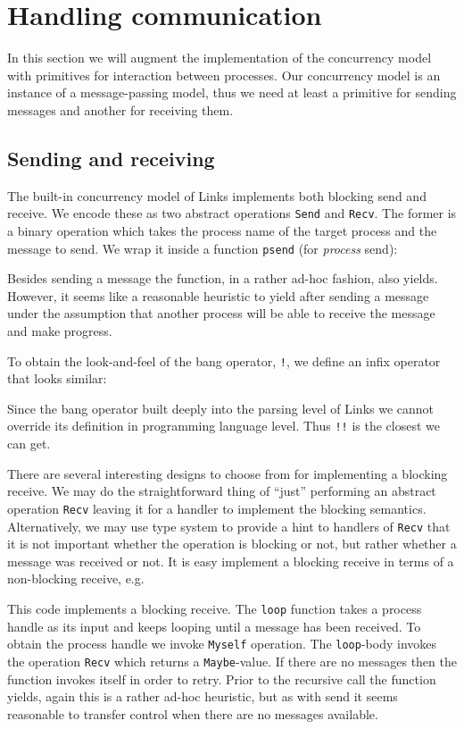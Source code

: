 \documentclass[12pt,mscres,cdtppar,twoside,openright,logo,rightchapter,normalheadings]{infthesis}
\newcommand{\snippet}[1]{}
\theoremstyle{definition}
\begin{document}
\section{Handling communication}
\label{sec:links-model-handlers-communication}

In this section we will augment the implementation of the concurrency
model with primitives for interaction between processes. Our
concurrency model is an instance of a message-passing model, thus we
need at least a primitive for sending messages and another for
receiving them.

\subsection{Sending and receiving}

The built-in concurrency model of Links implements both blocking send
and receive. We encode these as two abstract operations
\lstinline$Send$ and \lstinline$Recv$. The former is a binary
operation which takes the process name of the target process and the
message to send. We wrap it inside a function \lstinline$psend$ (for
\emph{process} send):
%
\snippet{psend.links}
%
Besides sending a message the function, in a rather ad-hoc fashion,
also yields. However, it seems like a reasonable heuristic to yield
after sending a message under the assumption that another process will
be able to receive the message and make progress.

To obtain the look-and-feel of the bang operator, \lstinline$!$, we
define an infix operator that looks similar:
%
\snippet{psendOp.links}
%
Since the bang operator built deeply into the parsing level of Links
we cannot override its definition in programming language level. Thus
\lstinline$!!$ is the closest we can get.

There are several interesting designs to choose from for implementing
a blocking receive. We may do the straightforward thing of ``just''
performing an abstract operation \lstinline$Recv$ leaving it for a
handler to implement the blocking semantics. Alternatively, we may use
type system to provide a hint to handlers of \lstinline$Recv$ that it
is not important whether the operation is blocking or not, but rather
whether a message was received or not. It is easy implement a blocking
receive in terms of a non-blocking receive, e.g.
%
\snippet{precv.links}
%
This code implements a blocking receive.  The \lstinline$loop$
function takes a process handle as its input and keeps looping until a
message has been received. To obtain the process handle we invoke
\lstinline$Myself$ operation. The \lstinline$loop$-body invokes the
operation \lstinline$Recv$ which returns a \lstinline$Maybe$-value. If
there are no messages then the function invokes itself in order to
retry. Prior to the recursive call the function yields, again this is
a rather ad-hoc heuristic, but as with send it seems reasonable to
transfer control when there are no messages available.
\end{document}

